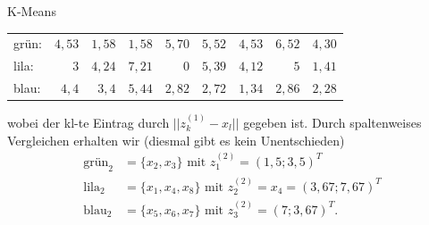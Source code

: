 \begin{task}[credit=6]{K-Means}
\begin{subtask}[points=6,title={K-Means Algorithmus}]
\begin{solution}
\begin{center}
\begin{tabular}{l|rrrrrrrr}
		grün: & $4,53$ & $1,58$ & $1,58$ & $5,70$ & $5,52$ & $4,53$ & $6,52$ & $4,30$  \\
		lila: & $3$ & $4,24$ & $7,21$ & $0$ & $5,39$ & $4,12$ & $5$ & $1,41$ \\
		blau: & $4,4$ & $3,4$ & $5,44$ & $2,82$ & $2,72$ & $1,34$ & $2,86$ & $2,28$
	\end{tabular}
\end{center} 
wobei der kl-te Eintrag durch $||z_k^{(1)}-x_l||$ gegeben ist. Durch spaltenweises Vergleichen erhalten wir (diesmal gibt es kein Unentschieden) \begin{align*}
\text{grün}_2 &= \{x_2, x_3\} \text{ mit } z_1^{(2)} = (1,5; 3,5)^T \\
\text{lila}_2 &= \{x_1, x_4, x_8\} \text{ mit } z_2^{(2)} = x_4 = (3,67;7,67)^T \\
\text{blau}_2 &= \{x_5, x_6, x_7\} \text{ mit } z_3^{(2)} = (7;3,67)^T.
\end{align*}
\end{solution}

\end{subtask}

\end{task}

